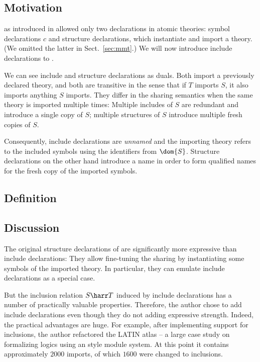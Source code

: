 \subsection{Motivation}

\mmt as introduced in \cite{RK:mmt:10} allowed only two declarations in atomic theories: symbol declarations $c$ and structure declarations, which instantiate and import a theory.
(We omitted the latter in Sect.~\ref{sec:mmt}.)
We will now introduce include declarations to \mmt.

We can see include and structure declarations as duals.
Both import a previously declared theory, and both are transitive in the sense that if $T$ imports $S$, it also imports anything $S$ imports.
They differ in the sharing semantics when the same theory is imported multiple times: Multiple includes of $S$ are redundant and introduce a single copy of $S$; multiple structures of $S$ introduce multiple fresh copies of $S$.

Consequently, include declarations are \emph{unnamed} and the importing theory refers to the included symbols using the identifiers from $\dom{S}$.
Structure declarations on the other hand introduce a name in order to form qualified names for the fresh copy of the imported symbols.

\subsection{Definition}


\subsection{Discussion}

The original structure declarations of \mmt are significantly more expressive than include declarations: They allow fine-tuning the sharing by instantiating some symbols of the imported theory.
In particular, they can emulate include declarations as a special case.

But the inclusion relation $S\harr T$ induced by include declarations has a number of practically valuable properties.
Therefore, the author chose to add include declarations even though they do not adding expressive strength.
Indeed, the practical advantages are huge.
For example, after implementing support for inclusions, the author refactored the LATIN atlas \cite{CHKMR:latinabs:11} -- a large case study on formalizing logics using an \mmt style module system.
At this point it contains approximately $2000$ imports, of which $1600$ were changed to inclusions.
\medskip

